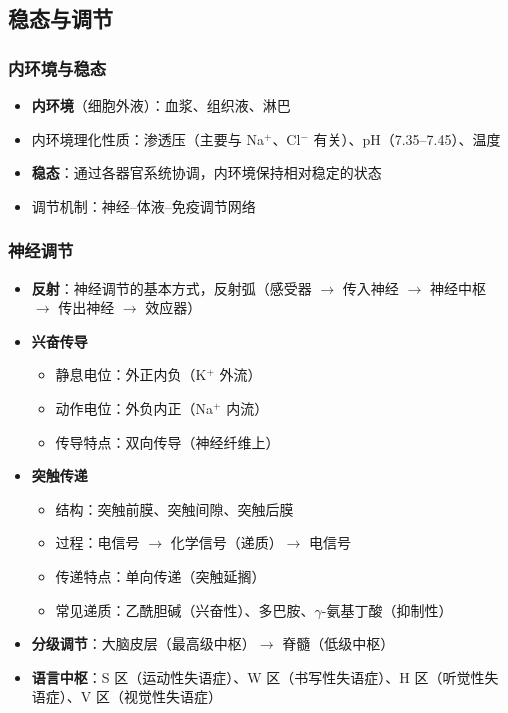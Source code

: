 \subsection{稳态与调节}

\subsubsection{内环境与稳态}

\begin{itemize}
  \item \textbf{内环境}（细胞外液）：血浆、组织液、淋巴
  \item 内环境理化性质：渗透压（主要与 Na$^+$、Cl$^-$ 有关）、pH（7.35--7.45）、温度
  \item \textbf{稳态}：通过各器官系统协调，内环境保持相对稳定的状态
  \item 调节机制：神经--体液--免疫调节网络
\end{itemize}

\subsubsection{神经调节}

\begin{itemize}
  \item \textbf{反射}：神经调节的基本方式，反射弧（感受器 $\to$ 传入神经 $\to$ 神经中枢 $\to$ 传出神经 $\to$ 效应器）
  \item \textbf{兴奋传导}
  \begin{itemize}
    \item 静息电位：外正内负（K$^+$ 外流）
    \item 动作电位：外负内正（Na$^+$ 内流）
    \item 传导特点：双向传导（神经纤维上）
  \end{itemize}
  \item \textbf{突触传递}
  \begin{itemize}
    \item 结构：突触前膜、突触间隙、突触后膜
    \item 过程：电信号 $\to$ 化学信号（递质）$\to$ 电信号
    \item 传递特点：单向传递（突触延搁）
    \item 常见递质：乙酰胆碱（兴奋性）、多巴胺、$\gamma$-氨基丁酸（抑制性）
  \end{itemize}
  \item \textbf{分级调节}：大脑皮层（最高级中枢）$\to$ 脊髓（低级中枢）
  \item \textbf{语言中枢}：S 区（运动性失语症）、W 区（书写性失语症）、H 区（听觉性失语症）、V 区（视觉性失语症）
\end{itemize}

